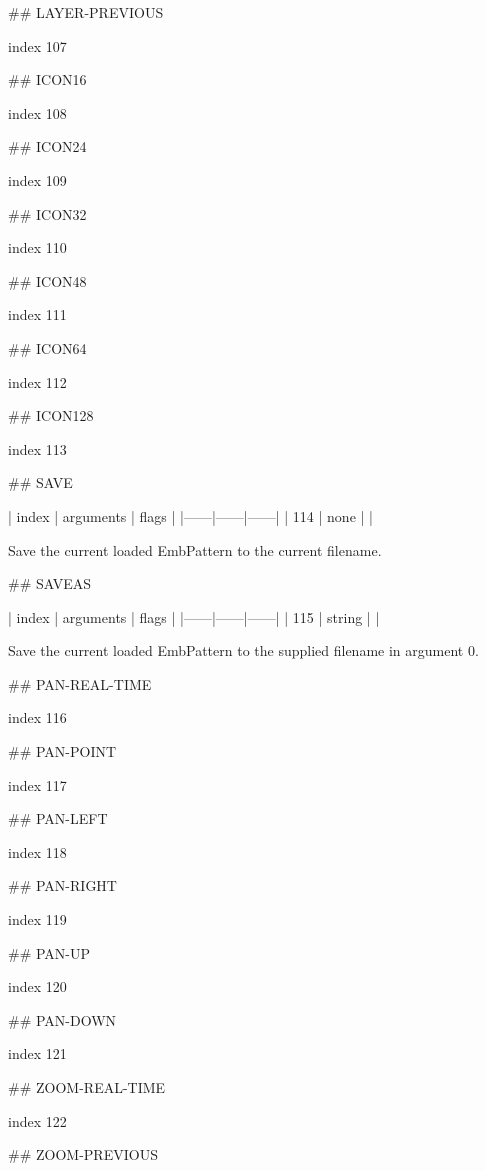 ## LAYER-PREVIOUS

index 107



## ICON16

index 108



## ICON24

index 109



## ICON32

index 110



## ICON48

index 111



## ICON64

index 112



## ICON128

index 113



## SAVE

| index | arguments | flags |
|------|------|------|
| 114 | none | |

Save the current loaded EmbPattern to the current filename.

## SAVEAS

| index | arguments | flags |
|------|------|------|
| 115 | string | |

Save the current loaded EmbPattern to the supplied filename in argument 0.

## PAN-REAL-TIME

index 116



## PAN-POINT

index 117



## PAN-LEFT

index 118



## PAN-RIGHT

index 119



## PAN-UP

index 120



## PAN-DOWN

index 121



## ZOOM-REAL-TIME

index 122



## ZOOM-PREVIOUS


